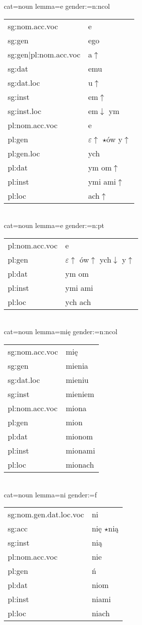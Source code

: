 \documentclass{article}
\begin{document}
\begin{multicols}{2}
cat=noun lemma=e gender:=n:ncol\\
\begin{tabular}{l|l}
sg:nom.acc.voc & e\\
sg:gen & ego\\
sg:gen|pl:nom.acc.voc & a$\uparrow$\\
sg:dat & emu\\
sg:dat.loc & u$\uparrow$\\
sg:inst & em$\uparrow$\\
sg:inst.loc & em$\downarrow$ ym\\
pl:nom.acc.voc & e\\
pl:gen & $\varepsilon\uparrow$ $\star$ów y$\uparrow$\\
pl:gen.loc & ych\\
pl:dat & ym om$\uparrow$\\
pl:inst & ymi ami$\uparrow$\\
pl:loc & ach$\uparrow$\\
\end{tabular}\\

cat=noun lemma=e gender:=n:pt\\
\begin{tabular}{l|l}
pl:nom.acc.voc & e\\
pl:gen & $\varepsilon\uparrow$ ów$\uparrow$ ych$\downarrow$ y$\uparrow$\\
pl:dat & ym om\\
pl:inst & ymi ami\\
pl:loc & ych ach\\
\end{tabular}\\

cat=noun lemma=mię gender:=n:ncol\\
\begin{tabular}{l|l}
sg:nom.acc.voc & mię\\
sg:gen & mienia\\
sg:dat.loc & mieniu\\
sg:inst & mieniem\\
pl:nom.acc.voc & miona\\
pl:gen & mion\\
pl:dat & mionom\\
pl:inst & mionami\\
pl:loc & mionach\\
\end{tabular}\\

cat=noun lemma=ni gender:=f\\
\begin{tabular}{l|l}
sg:nom.gen.dat.loc.voc & ni\\
sg:acc & nię $\star$nią\\
sg:inst & nią\\
pl:nom.acc.voc & nie\\
pl:gen & ń\\
pl:dat & niom\\
pl:inst & niami\\
pl:loc & niach\\
\end{tabular}\\


\end{multicols}
\end{document}
